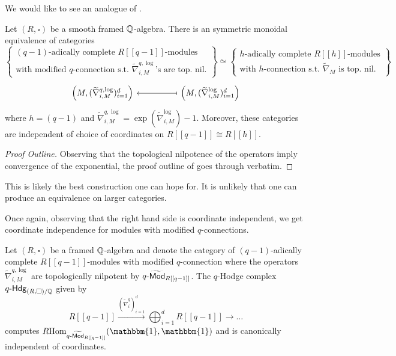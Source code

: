 We would like to see an analogue of . 
\begin{proposition}\label{prop: R-modules with modified connection}
    Let $(R,\square)$ be a smooth framed $\mathbb{Q}$-algebra. There is an symmetric monoidal equivalence of categories 
    $$\left\{\substack{(q-1)\text{-adically complete }R[[q-1]]\text{-modules} \\ \text{with modified }q\text{-connection s.t. }\widetilde{\nabla}^{q,\log}_{i,M}\text{'s are top. nil.}}\right\}\simeq\left\{\substack{h\text{-adically complete }R[[h]]\text{-modules} \\ \text{with }h\text{-connection s.t. }\widetilde{\nabla}_{M}\text{ is top. nil.}}\right\}$$
    $$%
    \begin{tikzcd}
        {\left(M,(\widetilde{\nabla}^{q,\log}_{i,M})_{i=1}^{d}\right)} && {\left(M,(\widetilde{\nabla}_{i,M}^{\log})_{i=1}^{d}\right)}
        \arrow[maps to, from=1-3, to=1-1]
    \end{tikzcd}$$
    where $h=(q-1)$ and $\widetilde{\nabla}^{q,\log}_{i,M}=\exp(\widetilde{\nabla}^{\log}_{i,M})-1$. Moreover, these categories are independent of choice of coordinates on $R[[q-1]]\cong R[[h]]$. 
\end{proposition}
\begin{proof}[Proof Outline]
    Observing that the topological nilpotence of the operators imply convergence of the exponential, the proof outline of  goes through verbatim. 
\end{proof}
\begin{remark}
    This is likely the best construction one can hope for. It is unlikely that one can produce an equivalence on larger categories.  
\end{remark}
Once again, observing that the right hand side is coordinate independent, we get coordinate independence for modules with modified $q$-connections. 
\begin{corollary}\label{corr: modules with modified q-connection are coordinate independent}
    Let $(R,\square)$ be a framed $\mathbb{Q}$-algebra and denote the category of $(q-1)$-adically complete $R[[q-1]]$-modules with modified $q$-connection where the operators $\widetilde{\nabla}_{i,M}^{q,\log}$ are topologically nilpotent by $q\text{-}\widetilde{\mathsf{Mod}}_{R[[q-1]]}$. The $q$-Hodge complex $q\text{-}\mathsf{Hdg}_{(R,\square)/\mathbb{Q}}$ given by 
    $$R[[q-1]]\xrightarrow{(\widetilde{\nabla}_{i}^{q})_{i=1}^{d}}\bigoplus_{i=1}^{d}R[[q-1]]\longrightarrow\dots$$
    computes $R\Hom_{q\dash\widetilde{\Mod}_{R[[q-1]]}}(\mathbbm{1},\mathbbm{1})$ and is canonically independent of coordinates. 
\end{corollary}

